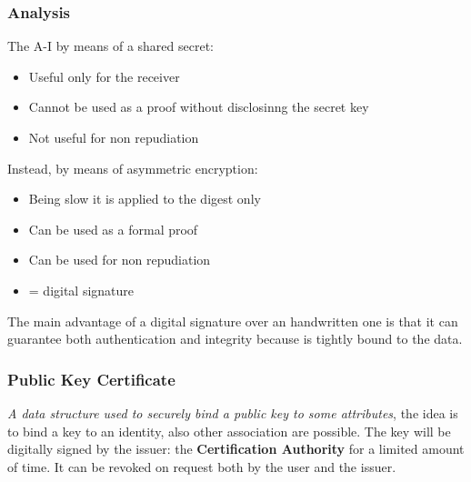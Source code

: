 \documentclass[12pt]{article}
\begin{document}
\subsubsection{Analysis}
The A-I by means of a shared secret:
\begin{itemize}
  \item Useful only for the receiver
  \item Cannot be used as a proof without disclosinng the secret key
  \item Not useful for non repudiation
\end{itemize}
Instead, by means of asymmetric encryption:
\begin{itemize}
  \item Being slow it is applied to the digest only
  \item Can be used as a formal proof
  \item Can be used for non repudiation
  \item = digital signature
\end{itemize}

The main advantage of a digital signature over an handwritten one is that it can guarantee both authentication and integrity because is tightly bound to the data.

\subsubsection{Public Key Certificate}
\textit{A data structure used to securely bind a public key to some attributes}, the idea is to bind a key to an identity, also other association are possible. The key will be digitally signed by the issuer: the \textbf{Certification Authority} for a limited amount of time. It can be revoked on request both by the user and the issuer.
\end{document}
